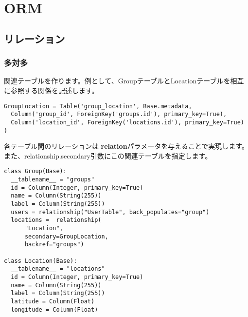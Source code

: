 \chapter{ORM}

\section{リレーション}

\subsection{多対多}

関連テーブルを作ります。例として、GroupテーブルとLocationテーブルを相互に参照する関係を記述します。

\begin{lstlisting}[caption=多対多]
GroupLocation = Table('group_location', Base.metadata,
  Column('group_id', ForeignKey('groups.id'), primary_key=True),
  Column('location_id', ForeignKey('locations.id'), primary_key=True)
)
\end{lstlisting}

各テーブル間のリレーションは \textbf{relation}パラメータを与えることで実現します。
また、relationship.secondary引数にこの関連テーブルを指定します。



\begin{lstlisting}[caption=テーブル定義]
class Group(Base):
  __tablename__ = "groups"
  id = Column(Integer, primary_key=True)
  name = Column(String(255))
  label = Column(String(255))
  users = relationship("UserTable", back_populates="group")
  locations =  relationship(
      "Location",
      secondary=GroupLocation,
      backref="groups")

class Location(Base):
  __tablename__ = "locations"
  id = Column(Integer, primary_key=True)
  name = Column(String(255))
  label = Column(String(255))
  latitude = Column(Float)
  longitude = Column(Float)
\end{lstlisting}
